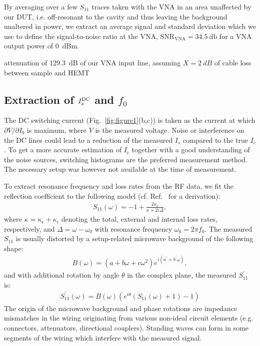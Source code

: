 By averaging over a few $S_{11}$ traces taken with the VNA in an area unaffected by our DUT, i.e. off-resonant to the cavity and thus leaving the background unaltered in power, we extract an average signal and standard deviation which we use to define the signal-to-noise ratio at the VNA, $\text{SNR}_\text{VNA}=\SI{34.5}{\decibel}$ for a VNA output power of \SI{0}{dBm}.

attenuation of \SI{129.3}{dB} of our VNA input line, assuming $X=\SI{2}{dB}$ of cable loss between sample and HEMT

\subsection{Extraction of $I_s^{\rm DC}$ and $f_0$}\label{sec:extraction}

The DC switching current (Fig.~\ref{fig:figure1}(b,c)) is taken as the current at which $\partial V/\partial I_b$ is maximum, where $V$ is the measured voltage.
%
Noise or interference on the DC lines could lead to a reduction of the measured $I_s$ compared to the true $I_c$.
%
To get a more accurate estimation of $I_c$ together with a good understanding of the noise sources, switching histograms are the preferred measurement method.
%
The necessary setup was however not available at the time of measurement.

To extract resonance frequency and loss rates from the RF data, we fit the reflection coefficient to the following model (cf. Ref.~\cite{bosmanBroadbandArchitectureGalvanically2015c} for a derivation):
%
\begin{align}
S_{11}(\omega) = -1+\frac{2\kappa_e}{\kappa+2i\Delta},
\end{align}
%
where $\kappa=\kappa_e+\kappa_i$ denoting the total, external and internal loss rates, respectively, and $\Delta=\omega-\omega_0$ with resonance frequency $\omega_0=2\pi f_0$.
%
The measured $S_{11}$ is usually distorted by a setup-related microwave background of the following shape:
\begin{align}
B(\omega) = \left(a+b\omega+c\omega^2\right)e^{i\left(a^\prime+b^\prime\omega\right)},
\end{align}
%
and with additional rotation by angle $\theta$ in the complex plane, the measured $S_{11}^\prime$ is:
\begin{align}
S_{11}^\prime(\omega)=B(\omega)\left(e^{i\theta}\left(S_{11}(\omega)+1\right)-1\right)
\end{align}
%
The origin of the microwave background and phase rotations are impedance mismatches in the wiring originating from various non-ideal circuit elements (e.g. connectors, attenuators, directional couplers).
%
Standing waves can form in some segments of the wiring which interfere with the measured signal.

